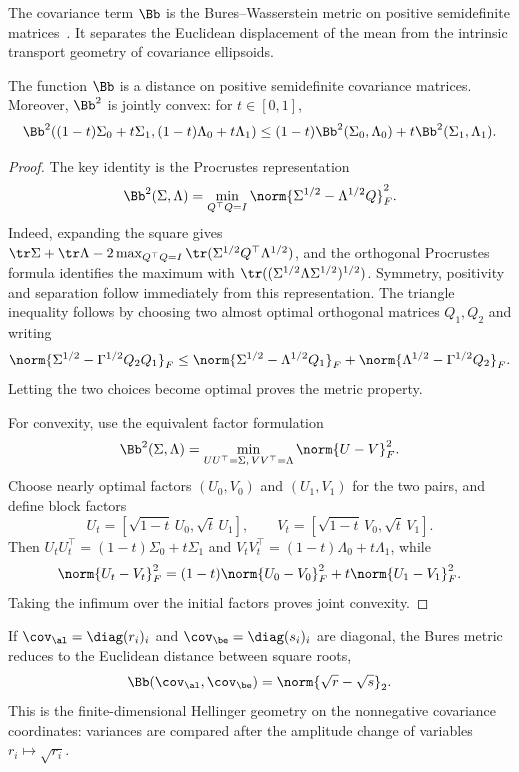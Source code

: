 The covariance term $\Bb$ is the Bures--Wasserstein metric on positive semidefinite matrices~\cite{bures1969extension,gelbrich1990formula,bhatia2018bures}. It separates the Euclidean displacement of the mean from the intrinsic transport geometry of covariance ellipsoids.

\begin{prop}\label{prop-bures-metric-convex}
	The function $\Bb$ is a distance on positive semidefinite covariance matrices. Moreover, $\Bb^2$ is jointly convex: for $t\in[0,1]$,
	\[
		\Bb^2((1-t)\Sigma_0+t\Sigma_1,(1-t)\Lambda_0+t\Lambda_1)
		\leq
		(1-t)\Bb^2(\Sigma_0,\Lambda_0)+t\Bb^2(\Sigma_1,\Lambda_1).
	\]
\end{prop}
\begin{proof}
	The key identity is the Procrustes representation
	\[
		\Bb^2(\Sigma,\Lambda)
		=
		\min_{Q^\top Q=I}\norm{\Sigma^{1/2}-\Lambda^{1/2}Q}_F^2.
	\]
	Indeed, expanding the square gives $\tr\Sigma+\tr\Lambda-2\max_{Q^\top Q=I}\tr(\Sigma^{1/2}Q^\top\Lambda^{1/2})$, and the orthogonal Procrustes formula identifies the maximum with $\tr((\Sigma^{1/2}\Lambda\Sigma^{1/2})^{1/2})$. Symmetry, positivity and separation follow immediately from this representation. The triangle inequality follows by choosing two almost optimal orthogonal matrices $Q_1,Q_2$ and writing
	\[
		\norm{\Sigma^{1/2}-\Gamma^{1/2}Q_2Q_1}_F
		\leq
		\norm{\Sigma^{1/2}-\Lambda^{1/2}Q_1}_F
		+
		\norm{\Lambda^{1/2}-\Gamma^{1/2}Q_2}_F.
	\]
	Letting the two choices become optimal proves the metric property.

	For convexity, use the equivalent factor formulation
	\[
		\Bb^2(\Sigma,\Lambda)
		=
		\min_{UU^\top=\Sigma,\thinspace VV^\top=\Lambda}\norm{U-V}_F^2.
	\]
	Choose nearly optimal factors $(U_0,V_0)$ and $(U_1,V_1)$ for the two pairs, and define block factors
	\[
		U_t=[\sqrt{1-t}\,U_0,\sqrt t\,U_1],
		\qquad
		V_t=[\sqrt{1-t}\,V_0,\sqrt t\,V_1].
	\]
	Then $U_tU_t^\top=(1-t)\Sigma_0+t\Sigma_1$ and $V_tV_t^\top=(1-t)\Lambda_0+t\Lambda_1$, while
	\[
		\norm{U_t-V_t}_F^2
		=
		(1-t)\norm{U_0-V_0}_F^2+t\norm{U_1-V_1}_F^2.
	\]
	Taking the infimum over the initial factors proves joint convexity.
\end{proof}

\begin{rem}
	If $\cov_\al=\diag(r_i)_i$ and $\cov_\be=\diag(s_i)_i$ are diagonal, the Bures metric reduces to the Euclidean distance between square roots,
	\[
		\Bb(\cov_\al,\cov_\be)=\norm{\sqrt r-\sqrt s}_2.
	\]
	This is the finite-dimensional Hellinger geometry on the nonnegative covariance coordinates: variances are compared after the amplitude change of variables $r_i\mapsto\sqrt{r_i}$.
\end{rem}
